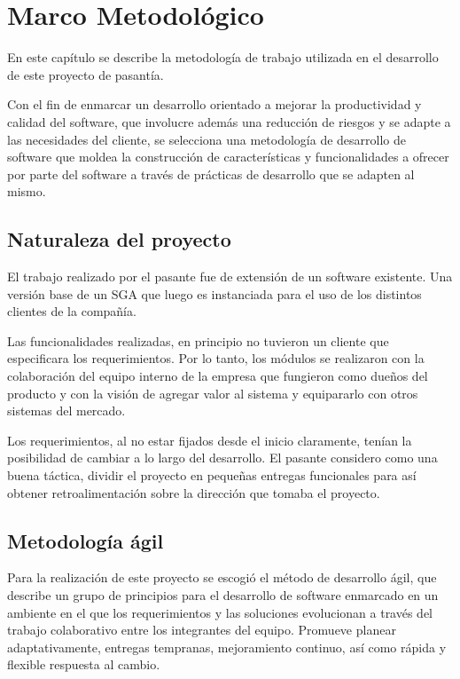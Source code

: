 \chapter{Marco Metodológico}
\thispagestyle{empty} %

En este capítulo se describe la metodología de trabajo utilizada en el desarrollo de este proyecto de pasantía.

Con el fin de enmarcar un desarrollo orientado a mejorar la productividad y calidad del software, que involucre además una reducción de riesgos y se adapte a las necesidades del cliente, se selecciona una metodología de desarrollo de software que moldea la construcción de características y funcionalidades a ofrecer por parte del software a través de prácticas de desarrollo que se adapten al mismo.

\section{Naturaleza del proyecto}
El trabajo realizado por el pasante fue de extensión de un software existente. Una versión base de un \gls{SGA} que luego es instanciada para el uso de los distintos clientes de la compañía. 

Las funcionalidades realizadas, en principio no tuvieron un cliente que especificara los requerimientos. Por lo tanto, los módulos se realizaron con la colaboración del equipo interno de la empresa que fungieron como dueños del producto y con la visión de agregar valor al sistema y equipararlo con otros sistemas del mercado.

Los requerimientos, al no estar fijados desde el inicio claramente, tenían la posibilidad de cambiar a lo largo del desarrollo. El pasante considero como una buena táctica, dividir el proyecto en pequeñas entregas funcionales para así obtener retroalimentación sobre la dirección que tomaba el proyecto.

\section{Metodología ágil}

Para la realización de este proyecto se escogió el método de desarrollo ágil, que describe un grupo de principios para el desarrollo de software enmarcado en un ambiente en el que los requerimientos y las soluciones evolucionan a través del trabajo colaborativo entre los integrantes del equipo. Promueve planear adaptativamente, entregas tempranas, mejoramiento continuo, así como rápida y flexible respuesta al cambio.

